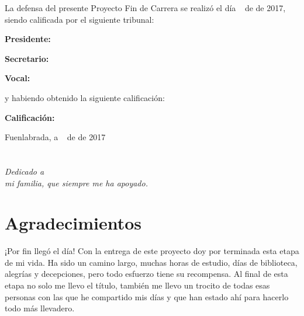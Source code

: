 \documentclass[a4paper, 12pt]{book}
\begin{document}
\vspace{1cm}
La defensa del presente Proyecto Fin de Carrera se realizó el día \qquad$\;\,$ de \qquad\qquad\qquad\qquad \newline de 2017, siendo calificada por el siguiente tribunal:


\vspace{0.5cm}
\textbf{Presidente:}

\vspace{1.2cm}
\textbf{Secretario:}

\vspace{1.2cm}
\textbf{Vocal:}


\vspace{1.2cm}
y habiendo obtenido la siguiente calificación:

\vspace{1cm}
\textbf{Calificación:}


\vspace{1cm}
\begin{flushright}
Fuenlabrada, a \qquad$\;\,$ de \qquad\qquad\qquad\qquad de 2017
\end{flushright}


\chapter*{}
\begin{flushright}
\textit{Dedicado a \\
mi familia, que siempre me ha apoyado.}
\end{flushright}


\chapter*{Agradecimientos}

¡Por fin llegó el día! Con la entrega de este proyecto doy por terminada esta etapa de mi vida. Ha sido un camino largo, muchas horas de estudio, días de biblioteca, alegrías y decepciones, pero todo esfuerzo tiene su recompensa. Al final de esta etapa no solo me llevo el título, también me llevo un trocito de todas esas personas con las que he compartido mis días y que han estado ahí para hacerlo todo más llevadero.
\end{document}
